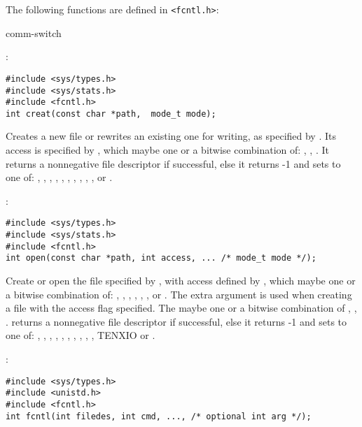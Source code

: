 The following functions are defined in \verb+<fcntl.h>+:
\begin{Ventry2}{comm-switch  }

\item[creat]
\label{item:creat}
:
\begin{production}
\begin{verbatim}
#include <sys/types.h>
#include <sys/stats.h>
#include <fcntl.h>
int creat(const char *path,  mode_t mode);
\end{verbatim}
\end{production}

Creates a new file or rewrites an existing one for writing,  as
specified by . Its access is specified by , 
which maybe one or a bitwise combination of:
, , . 
It returns a nonnegative file descriptor if
successful, else it returns -1 and sets  to one of:
, , , , , , 
, , , , or .
  


\item[open]
\label{item:open}
:
\begin{production}
\begin{verbatim}
#include <sys/types.h> 
#include <sys/stats.h> 
#include <fcntl.h> 
int open(const char *path, int access, ... /* mode_t mode */);
\end{verbatim}
\end{production}

Create or open the file specified by , with access defined by
, which maybe one or a bitwise combination of:
, , , ,  
,  ,  or .  
The extra argument  is used when creating a file with the
access flag  specified. The  maybe one or a bitwise
combination of
, , .  
returns a nonnegative file descriptor if successful, else it returns
-1 and sets  to one of: 
, , , , , , 
, , , , T{ENXIO} or .
  


\item[fcntl]
\label{item:fcntl}
:
\begin{production}
\begin{verbatim}
#include <sys/types.h>
#include <unistd.h>
#include <fcntl.h>
int fcntl(int filedes, int cmd, ..., /* optional int arg */);
\end{verbatim}
\end{production}


\end{Ventry2}
